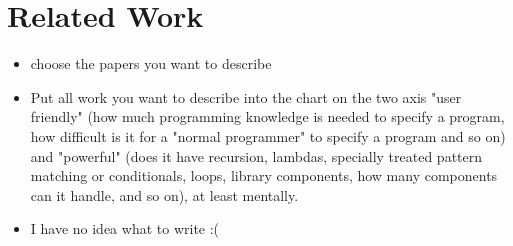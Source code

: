 \chapter{Related Work} \label{relatedwork}


\begin{itemize}
\item choose the papers you want to describe
\item Put all work you want to describe into the chart on the two axis "user friendly" (how much programming knowledge is needed to specify a program, how difficult is it for a "normal programmer" to specify a program and so on) and "powerful" (does it have recursion, lambdas, specially treated pattern matching or conditionals, loops, library components, how many components can it handle, and so on), at least mentally.
\item I have no idea what to write :(
\end{itemize}


